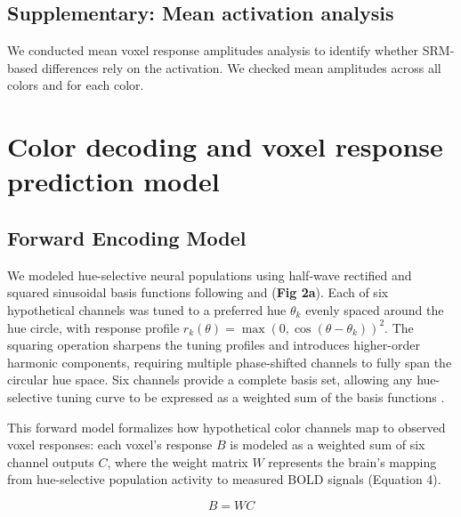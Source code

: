 \subsection*{Supplementary: Mean activation analysis}

We conducted mean voxel response amplitudes analysis to identify whether SRM-based differences rely on the activation. We checked mean amplitudes across all colors and for each color.

\section{Color decoding and voxel response prediction model}

\subsection*{Forward Encoding Model}

We modeled hue-selective neural populations using half-wave rectified and squared sinusoidal basis functions following  and  (\textbf{Fig 2a}). Each of six hypothetical channels was tuned to a preferred hue $\theta_k$ evenly spaced around the hue circle, with response profile $r_k(\theta) = \max(0, \cos(\theta - \theta_k))^2$. The squaring operation sharpens the tuning profiles and introduces higher-order harmonic components, requiring multiple phase-shifted channels to fully span the circular hue space. Six channels provide a complete basis set, allowing any hue-selective tuning curve to be expressed as a weighted sum of the basis functions \cite{freeman1991}.

This forward model formalizes how hypothetical color channels map to observed voxel responses: each voxel's response $B$ is modeled as a weighted sum of six channel outputs $C$, where the weight matrix $W$ represents the brain's mapping from hue-selective population activity to measured BOLD signals (Equation 4).

\begin{equation}
B = W C
\end{equation}

